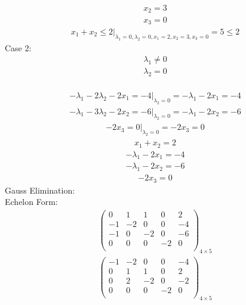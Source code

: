 \documentclass{article}
\begin{document}
\begin{align*}
x_{2}=3\end{align*}
\begin{align*}
x_{3}=0\end{align*}
\begin{align*}
\left.x_{1} + x_{2}\le2\right|_{\lambda_{1}=0,\lambda_{2}=0,x_{1}=2,x_{2}=3,x_{3}=0}=5\le2\end{align*}
Case 2: \begin{align*}
\lambda_{1}\ne0\end{align*}
 \begin{align*}
\lambda_{2}=0\end{align*}
 \\
\begin{align*}
\left.-\lambda_{1} - 2\lambda_{2} - 2x_{1}=-4\right|_{\lambda_{2}=0}=-\lambda_{1} - 2x_{1}=-4\end{align*}
\begin{align*}
\left.-\lambda_{1} - 3\lambda_{2} - 2x_{2}=-6\right|_{\lambda_{2}=0}=-\lambda_{1} - 2x_{2}=-6\end{align*}
\begin{align*}
\left.-2x_{3}=0\right|_{\lambda_{2}=0}=-2x_{3}=0\end{align*}
\begin{align*}
x_{1} + x_{2}=2\end{align*}
\begin{align*}
-\lambda_{1} - 2x_{1}=-4\end{align*}
\begin{align*}
-\lambda_{1} - 2x_{2}=-6\end{align*}
\begin{align*}
-2x_{3}=0\end{align*}
Gauss Elimination:\\
Echelon Form:\\
\begin{align*}
\left(
\begin{array}{cccc|c}
0 & 1 & 1 & 0 & 2\\
-1 & -2 & 0 & 0 & -4\\
-1 & 0 & -2 & 0 & -6\\
0 & 0 & 0 & -2 & 0\\
\end{array}
\right)_{4\times 5}
\end{align*}
\begin{align*}
\left(
\begin{array}{cccc|c}
-1 & -2 & 0 & 0 & -4\\
0 & 1 & 1 & 0 & 2\\
0 & 2 & -2 & 0 & -2\\
0 & 0 & 0 & -2 & 0\\
\end{array}
\right)_{4\times 5}
\end{align*}
\end{document}
